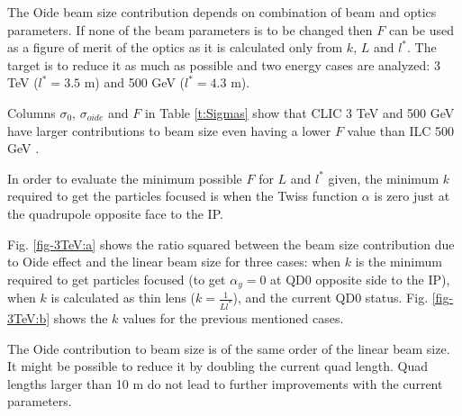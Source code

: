 The Oide beam size contribution depends on combination of beam and optics parameters. %
If none of the beam parameters is to be changed then $F$ can be used as a figure of merit of the optics as it is calculated only from $k$, $L$ and $l^*$. The target is to reduce it as much as possible and two energy cases are analyzed: 3 TeV ($l^*=3.5$ m) and 500 GeV ($l^*=4.3$ m).\par
Columns $\sigma_0$, $\sigma_{oide}$ and $F$ in Table \ref{t:Sigmas} show that CLIC 3 TeV and 500 GeV \cite{CLICdes,TomasCLIC} have larger contributions to beam size even having a lower $F$ value than ILC 500 GeV \cite{ILCdes}.\par
In order to evaluate the minimum possible $F$ for $L$ and $l^*$ given, the minimum $k$ required to get the particles focused is when the Twiss function $\alpha$ is zero just at the quadrupole opposite face to the IP.\par
Fig. \ref{fig-3TeV:a}  shows the ratio squared between the beam size contribution due to Oide effect and the linear beam size for three cases: when $k$ is the minimum required to get particles focused (to get $\alpha_y=0$ at QD0 opposite side to the IP), when $k$ is calculated as thin lens ($k=\frac{1}{Ll^*}$), and the current QD0 status. Fig. \ref{fig-3TeV:b} shows the $k$ values for the previous mentioned cases.\par
The Oide contribution to beam size is of the same order of the linear beam size. It might be possible to reduce it by doubling the current quad length. Quad lengths larger than 10 m do not lead to further improvements with the current parameters.\par

